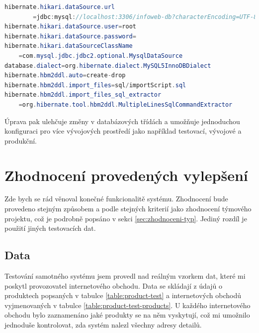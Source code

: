 \documentclass[thesis=B,czech]{FITthesis}[2012/06/26]
\begin{document}
\begin{lstlisting}[language=Java, caption={Nastavení připojení do databáze.}]
hibernate.hikari.dataSource.url
		=jdbc:mysql://localhost:3306/infoweb-db?characterEncoding=UTF-8
hibernate.hikari.dataSource.user=root
hibernate.hikari.dataSource.password=
hibernate.hikari.dataSourceClassName
	=com.mysql.jdbc.jdbc2.optional.MysqlDataSource
database.dialect=org.hibernate.dialect.MySQL5InnoDBDialect
hibernate.hbm2ddl.auto=create-drop
hibernate.hbm2ddl.import_files=sql/importScript.sql
hibernate.hbm2ddl.import_files_sql_extractor
	=org.hibernate.tool.hbm2ddl.MultipleLinesSqlCommandExtractor
\end{lstlisting}

Úprava pak ulehčuje změny v databázových třídách a umožňuje jednoduchou konfiguraci pro více vývojových prostředí jako například testovací, vývojové
a produkční.


\chapter{Zhodnocení provedených vylepšení}
Zde bych se rád věnoval konečné funkcionalitě systému. Zhodnocení bude provedeno stejným způsobem a podle stejných kriterií jako zhodnocení
týmového projektu, což je podrobně popsáno v sekci \ref{sec:zhodnoceni-typ}. Jediný rozdíl je použití jiných testovacích dat.


\section{Data}
Testování samotného systému jsem provedl nad reálným vzorkem dat, které mi poskytl provozovatel internetového obchodu.
Data se skládají z údajů o produktech popsaných v tabulce \ref{table:product-test} a internetových obchodů vyjmenovaných v tabulce
\ref{table:product-test-products}.
U každého internetového obchodu bylo zaznamenáno jaké produkty se na něm vyskytují, což mi umožnilo jednoduše kontrolovat, zda systém nalezl všechny adresy detailů.
\end{document}
